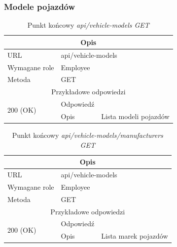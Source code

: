 \documentclass[eng,printmode,openany]{mgr}
\begin{document}
\subsubsection{Modele pojazdów}
\begin{table}[H]
	\caption{Punkt końcowy \textit{api/vehicle-models GET}}
	\begin{tabularx}{\textwidth}{|l|l|X|}
		\hline
		\multicolumn{3}{|c|}{Opis}                         						\\ \hline
		URL                       & \multicolumn{2}{l|}{api/vehicle-models} 	\\ \hline
		Wymagane role             & \multicolumn{2}{l|}{Employee} \\ \hline
		Metoda                    & \multicolumn{2}{l|}{GET} 					\\ \hline
		\multicolumn{3}{|c|}{ Przykładowe odpowiedzi}                   		\\ \hline
		\multirow{2}{*}{200 (OK)} 			& Odpowiedź     &        \\ \cline{2-3} 
		& Opis         	& Lista modeli pojazdów       											\\ \hline
	\end{tabularx}
\end{table}

\begin{table}[H]
	\caption{Punkt końcowy \textit{api/vehicle-models/manufacturers GET}}
	\begin{tabularx}{\textwidth}{|l|l|X|}
		\hline
		\multicolumn{3}{|c|}{Opis}                         						\\ \hline
		URL                       & \multicolumn{2}{l|}{api/vehicle-models} 	\\ \hline
		Wymagane role             & \multicolumn{2}{l|}{Employee} \\ \hline
		Metoda                    & \multicolumn{2}{l|}{GET} 					\\ \hline
		\multicolumn{3}{|c|}{ Przykładowe odpowiedzi}                   		\\ \hline
		\multirow{2}{*}{200 (OK)} 			& Odpowiedź     &      \\ \cline{2-3} 
		& Opis         	& Lista marek pojazdów       														\\ \hline
	\end{tabularx}
\end{table}
\end{document}
